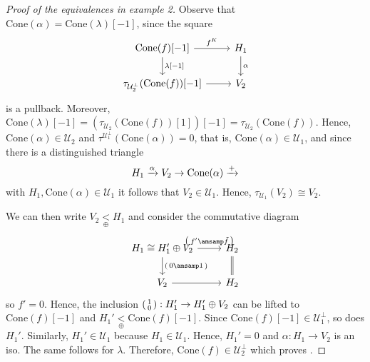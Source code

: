 \begin{proof}[Proof of the equivalences in example 2]
  Observe that $\mathrm{Cone}(\alpha)=\mathrm{Cone}(\lambda)[-1]$, since
  the square
  \begin{equation*}
    \begin{tikzcd}
      \mathrm{Cone}(f)[-1]\arrow{r}{f^K}\arrow{d}{\lambda[-1]}
        & H_1\arrow{d}{\alpha} \\
      \tau_{\mathcal{U}_2^\perp}(\mathrm{Cone}(f))[-1]\arrow{r}
        & V_2
    \end{tikzcd}
  \end{equation*}
  is a pullback. Moreover, $\mathrm{Cone}(\lambda)[-1] = (\tau_{\mathcal{U}_2}(\mathrm{Cone}(f))[1])[-1]
  =\tau_{\mathcal{U}_2}(\mathrm{Cone}(f))$. Hence, $\mathrm{Cone}(\alpha)\in \mathcal{U}_2$ and
  $\tau^{\mathcal{U}_1^\perp}(\mathrm{Cone}(\alpha))=0$, that is,
  $\mathrm{Cone}(\alpha)\in\mathcal{U}_1$, and since there is a distinguished triangle
  \begin{equation*}
    H_1\xrightarrow{\alpha} V_2\to \mathrm{Cone}(\alpha)\xrightarrow{+}
  \end{equation*}
  with $H_1,\mathrm{Cone}(\alpha)\in\mathcal{U}_1$ it follows that
  $V_2\in\mathcal{U}_1$. Hence, $\tau_{\mathcal{U}_1}(V_2)\cong V_2$.

  We can then write $V_2\underset{\oplus}{<}H_1$ and consider the commutative diagram
  \begin{equation*}
    \begin{tikzcd}
      H_1 \cong H_1'\oplus V_2\arrow{r}{
        \begin{psmallmatrix}
          f' \amsamp \tilde{f}
        \end{psmallmatrix}
      }\arrow{d}{
        \begin{psmallmatrix}
          0 \amsamp 1
        \end{psmallmatrix}
      }
        & H_2\arrow[equal]{d}\\
      V_2\arrow{r}
        & H_2
    \end{tikzcd}
  \end{equation*}
  so $f'=0$. Hence, the inclusion $
  \begin{psmallmatrix}
    1 \\ 0
  \end{psmallmatrix}:H_1'\to H_1'\oplus V_2$ can be lifted to
  $\mathrm{Cone}(f)[-1]$ and $H_1'\underset{\oplus}{<}\mathrm{Cone}(f)[-1]$.
  Since $\mathrm{Cone}(f)[-1]\in \mathcal{U}_1^\perp$, so does $H_1'$. Similarly,
  $H_1'\in\mathcal{U}_1$ because $H_1\in\mathcal{U}_1$. Hence, $H_1'=0$ and $\alpha:H_1\to V_2$ is an iso.
  The same follows for $\lambda$. Therefore, $\mathrm{Cone}(f)\in\mathcal{U}_2^\perp$ which
  proves \triangb.
\end{proof}

